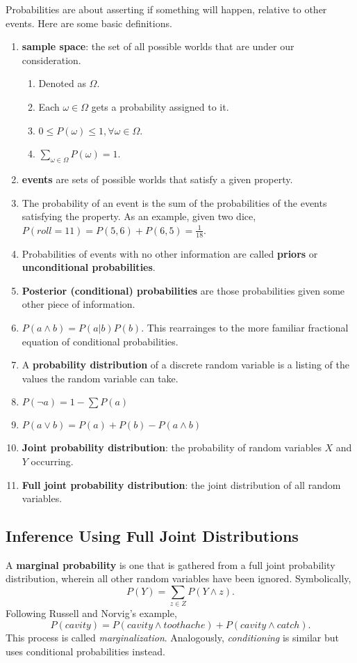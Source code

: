 \documentclass[10pt, twocolumn]{article}
\begin{document}
Probabilities are about asserting if something will happen, relative to other
events.  Here are some basic definitions.
\begin{enumerate}
    \itemsep -4pt
    \item \textbf{sample space}: the set of all possible worlds that are under
          our consideration.
        \begin{enumerate}
            \item Denoted as $ \Omega $.
            \item Each $ \omega \in \Omega $ gets a probability assigned to it.
            \item $ 0 \leq P(\omega) \leq 1, \forall \omega \in \Omega $.
            \item $\sum_{\omega \in \Omega} P(\omega) = 1 $.
        \end{enumerate}
    \item  \textbf{events} are sets of possible worlds that satisfy a given property.
    \item The probability of an event is the sum of the probabilities of the
          events satisfying the property.  As an example, given two dice,
          $ P(roll = 11) = P(5,6) + P(6,5) = \frac{1}{18}$.
    \item Probabilities of events with no other information are called
          \textbf{priors} or \textbf{unconditional probabilities}.
    \item \textbf{Posterior (conditional) probabilities} are those
          probabilities given some other piece of information.
    \item $ P(a \land b) = P (a \vert b) P(b) $. This rearrainges to the more
        familiar fractional equation of conditional probabilities.
    \item A \textbf{probability distribution} of a discrete random variable is
        a listing of the values the random variable can take.
    \item $ P(\lnot a) = 1 - \sum P(a) $
    \item $ P(a \lor b) = P(a) + P(b) - P(a \land b) $
    \item \textbf{Joint probability distribution}: the probability of random
          variables $X$ and $Y$ occurring.
      \item \textbf{Full joint probability distribution}: the joint
          distribution of all random variables.
\end{enumerate}

\subsection*{Inference Using Full Joint Distributions}
A \textbf{marginal probability} is one that is gathered from a full joint
probability distribution, wherein all other random variables have been
ignored.  Symbolically,
\[
    P(Y) = \sum_{z \in Z} P(Y \land z).
\]
Following Russell and Norvig's example,
\[
    P(cavity) = P(cavity \land toothache) +  P(cavity \land catch).
\]
This process is called \textit{marginalization}. Analogously,
\textit{conditioning} is similar but uses conditional probabilities instead.
\end{document}
